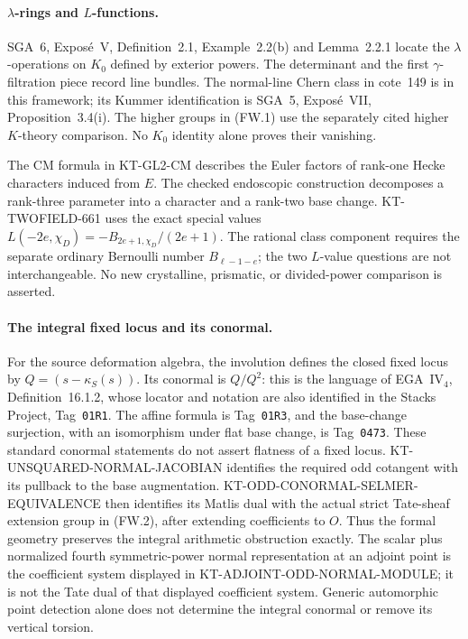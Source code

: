 \paragraph{$\lambda$-rings and $L$-functions.}
SGA~6, Expos\'e~V, Definition~2.1, Example~2.2(b) and
Lemma~2.2.1 locate the $\lambda$-operations on $K_0$ defined
by exterior powers. The determinant and the first
$\gamma$-filtration piece record line bundles. The normal-line
Chern class in cote~149 is in this framework; its Kummer
identification is SGA~5, Expos\'e~VII, Proposition~3.4(i).
The higher groups in (FW.1) use the separately cited higher
$K$-theory comparison. No $K_0$ identity alone proves their
vanishing.

The CM formula in KT-GL2-CM describes the Euler factors of
rank-one Hecke characters induced from $E$. The checked endoscopic
construction decomposes a rank-three parameter
into a character and a rank-two base change. KT-TWOFIELD-661
uses the exact special values
$L(-2e,\chi_D)=-B_{2e+1,\chi_D}/(2e+1)$.
The rational class component requires the separate ordinary
Bernoulli number $B_{\ell-1-e}$; the two $L$-value questions
are not interchangeable. No new crystalline, prismatic, or
divided-power comparison is asserted.

\paragraph{The integral fixed locus and its conormal.}
For the source deformation algebra, the involution defines
the closed fixed locus by $Q=(s-\kappa_S(s))$.
Its conormal is $Q/Q^2$: this is the language of EGA~IV$_4$,
Definition~16.1.2, whose locator and notation are also identified
in the Stacks Project, Tag~\texttt{01R1}.  The affine formula
is Tag~\texttt{01R3}, and the base-change surjection, with an
isomorphism under flat base change, is Tag~\texttt{0473}.
These standard conormal statements do not assert flatness
of a fixed locus.  KT-UNSQUARED-NORMAL-JACOBIAN identifies
the required odd cotangent with its pullback to the base
augmentation.  KT-ODD-CONORMAL-SELMER-EQUIVALENCE then
identifies its Matlis dual with the actual strict Tate-sheaf
extension group in (FW.2), after extending coefficients to $O$.
Thus the formal geometry preserves the integral arithmetic
obstruction exactly.  The scalar plus normalized fourth
symmetric-power normal representation at an adjoint point
is the coefficient system displayed in KT-ADJOINT-ODD-NORMAL-MODULE;
it is not the Tate dual of that displayed coefficient system.
Generic automorphic point detection alone does not determine
the integral conormal or remove its vertical torsion.

